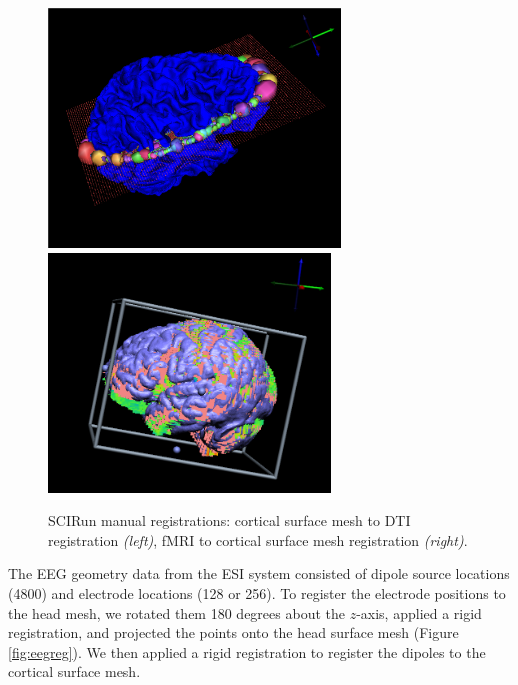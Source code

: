 \begin{figure}[H]
\begin{center}
\includegraphics[height = 2.5in]{Figures/DTI_reg}
\includegraphics[height = 2.5in]{Figures/fmri_reg}
\caption{SCIRun manual registrations: cortical surface mesh to DTI registration \textit{(left)}, fMRI to cortical surface mesh registration \textit{(right)}.}
\label{fig:dtireg}
\end{center}
\end{figure}

The EEG geometry data from the ESI system consisted of dipole source locations (4800) and electrode locations (128 or 256). To register the electrode positions to the head mesh, we rotated them 180 degrees about the $z$-axis, applied a rigid registration, and projected the points onto the head surface mesh (Figure \ref{fig:eegreg}). We then applied a rigid registration to register the dipoles to the cortical surface mesh.

